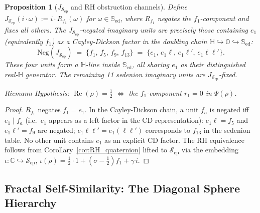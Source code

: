 \documentclass[12pt,a4paper]{article}
\newtheorem{proposition}[theorem]{Proposition}
\theoremstyle{remark}
\begin{document}
\begin{proposition}[$J_{\mathcal{S}_{\mathrm{ep}}}$ and RH obstruction channels]
\label{prop:J_septonian}
Define
$J_{\mathcal{S}_{\mathrm{ep}}}(i\cdot\omega) := i\cdot R_{f_1}(\omega)$
for $\omega\in\mathbb{S}_{\mathrm{ed}}$, where $R_{f_1}$ negates the $f_1$-component
and fixes all others.
The $J_{\mathcal{S}_{\mathrm{ep}}}$-negated imaginary units are precisely those
containing $e_1$ (equivalently $f_1$) as a Cayley-Dickson factor in
the doubling chain $\mathbb{H}\hookrightarrow\mathbb{O}\hookrightarrow\mathbb{S}_{\mathrm{ed}}$:
\[
  \mathrm{Neg}(J_{\mathcal{S}_{\mathrm{ep}}}) \;=\;
  \{f_1,\, f_5,\, f_9,\, f_{13}\}
  \;=\; \{e_1,\, e_1\ell,\, e_1\ell',\, e_1\ell\ell'\}.
\]
These four units form a $\mathbb{H}$-line inside $\mathbb{S}_{\mathrm{ed}}$, all
sharing $e_1$ as their distinguished real-$\mathbb{H}$ generator.
The remaining 11 sedenion imaginary units are $J_{\mathcal{S}_{\mathrm{ep}}}$-fixed.

Riemann Hypothesis: $\operatorname{Re}(\rho)=\tfrac{1}{2}$
$\Longleftrightarrow$ the $f_1$-component $r_1=0$ in $\Psi(\rho)$.
\end{proposition}
\begin{proof}
$R_{f_1}$ negates $f_1=e_1$.  In the Cayley-Dickson chain,
a unit $f_a$ is negated iff $e_1\mid f_a$ (i.e.\ $e_1$ appears as a
left factor in the CD representation):
$e_1\ell = f_5$ and $e_1\ell'=f_9$ are negated;
$e_1\ell\ell'=e_1(\ell\ell')$ corresponds to $f_{13}$ in the sedenion
table.
No other unit contains $e_1$ as an explicit CD factor.
The RH equivalence follows from Corollary~\ref{cor:RH_quaternion}
lifted to $\mathcal{S}_{\mathrm{ep}}$ via the embedding $\iota:\mathbb{C}\hookrightarrow\mathcal{S}_{\mathrm{ep}}$,
$\iota(\rho)=\tfrac{1}{2}\cdot 1 + (\sigma-\tfrac{1}{2})f_1 + \gamma\,i$.
\end{proof}

\subsection*{Fractal Self-Similarity: The Diagonal Sphere Hierarchy}
\end{document}
